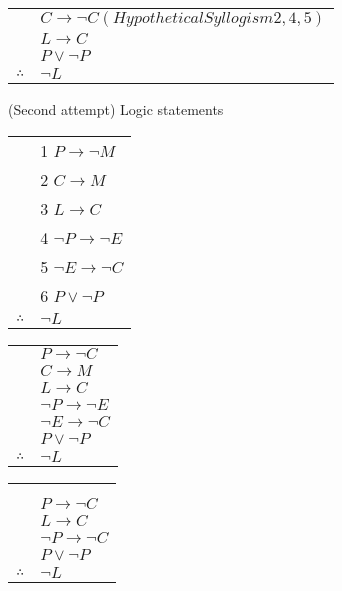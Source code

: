 \documentclass{article}
\begin{document}
\newline
\begin{tabular}{c@{\,}l@{}} 
                         & $C \rightarrow \neg C (Hypothetical Syllogism 2,4,5)$ \\
                         & $L \rightarrow C$ \\
\arrayrulecolor{blue}    & $P \vee \neg P$ \\
\cline{2-2}
    $\therefore$         & $\neg L$ \\
\end{tabular}

(Second attempt) Logic statements
\newline
\newline
\begin{tabular}{c@{\,}l@{}} 
                         & 1 $P \rightarrow \neg M$ \\
                         & 2 $C \rightarrow M$ \\
                         & 3 $L \rightarrow C$ \\
                         & 4 $\neg P \rightarrow \neg E$ \\
                         & 5 $\neg E \rightarrow \neg C$ \\
\arrayrulecolor{blue}    & 6 $P \vee \neg P$ \\
\cline{2-2}
    $\therefore$         & $\neg L$ \\
\end{tabular}
\begin{tabular}{c@{\,}l@{}} 
                         & $P \rightarrow \neg C$ \\
                         & $C \rightarrow M$ \\
                         & $L \rightarrow C$ \\
                         & $\neg P \rightarrow \neg E$ \\
                         & $\neg E \rightarrow \neg C$ \\
\arrayrulecolor{blue}    & $P \vee \neg P$ \\
\cline{2-2}
    $\therefore$         & $\neg L$ \\
\end{tabular}
\begin{tabular}{c@{\,}l@{}} 
                         &\\ &\\ & $P \rightarrow \neg C$ \\
                         & $L \rightarrow C$ \\
                         & $\neg P \rightarrow \neg C$ \\
\arrayrulecolor{blue}    & $P \vee \neg P$ \\
\cline{2-2}
    $\therefore$         & $\neg L$ \\
\end{tabular}
\end{document}

